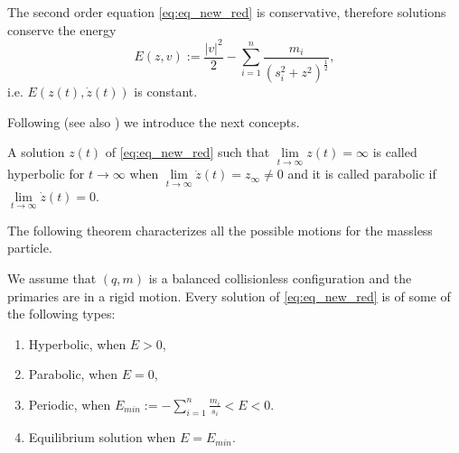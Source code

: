 \documentclass[smallcondensed]{svjour3}
\begin{document}
The second order equation \eqref{eq:eq_new_red} is conservative, therefore solutions conserve the energy
\begin{equation}\label{eq:conser.energ}
E(z,v):=\frac{|v|^2}{2}-\sum_{i=1}^{n} \frac{m_i}{\left(s_i^2+z^2\right)^{\frac12}},
\end{equation}
i.e. $E(z(t),\dot{z}(t))$ is constant.



Following \cite{VladimirI.Arnold229} (see also \cite{marchesin2013spatial})  we introduce the next concepts.
\begin{definition}[Chazy, 1922]
 A solution $z(t)$ of \eqref{eq:eq_new_red} such that  $\lim\limits_{t\to\infty}z(t)=\infty$ is called hyperbolic for $t\to \infty$ when $\lim\limits_{t\to\infty}\dot{z}(t)= z_{\infty}\neq 0$ and it  is called parabolic if $\lim\limits_{t\to\infty}\dot{z}(t)=0$.
\end{definition}






The following theorem characterizes all the possible motions for the massless particle.

\begin{theorem}\label{thm:prin_ine} We assume that $(q,m)$ is a balanced collisionless configuration and the primaries are in a rigid motion. Every solution of \eqref{eq:eq_new_red} is of some of the following types:
\begin{enumerate}
\item\label{1} Hyperbolic, when $E>0$,
\item\label{2} Parabolic, when $E=0$,
\item\label{3} Periodic, when $E_{min}:=-\sum_{i=1}^{n}\frac{m_i}{s_i}<E<0$.
\item\label{4} Equilibrium solution when $E=E_{min}$.
\end{enumerate}
\end{theorem}
\end{document}
